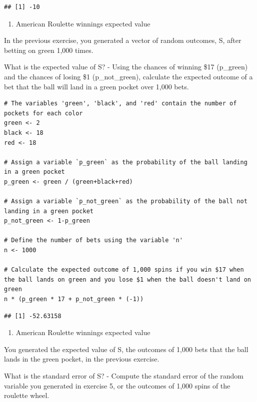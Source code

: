 \documentclass[
]{article}
\providecommand{\tightlist}{%
  \setlength{\itemsep}{0pt}\setlength{\parskip}{0pt}}
\begin{document}
\begin{verbatim}
## [1] -10
\end{verbatim}

\begin{enumerate}
\def\labelenumi{\arabic{enumi}.}
\setcounter{enumi}{5}
\tightlist
\item
  American Roulette winnings expected value
\end{enumerate}

In the previous exercise, you generated a vector of random outcomes, S,
after betting on green 1,000 times.

What is the expected value of S? - Using the chances of winning \$17
(p\_green) and the chances of losing \$1 (p\_not\_green), calculate the
expected outcome of a bet that the ball will land in a green pocket over
1,000 bets.

\begin{verbatim}
# The variables 'green', 'black', and 'red' contain the number of pockets for each color
green <- 2
black <- 18
red <- 18

# Assign a variable `p_green` as the probability of the ball landing in a green pocket
p_green <- green / (green+black+red)

# Assign a variable `p_not_green` as the probability of the ball not landing in a green pocket
p_not_green <- 1-p_green

# Define the number of bets using the variable 'n'
n <- 1000

# Calculate the expected outcome of 1,000 spins if you win $17 when the ball lands on green and you lose $1 when the ball doesn't land on green
n * (p_green * 17 + p_not_green * (-1))
\end{verbatim}

\begin{verbatim}
## [1] -52.63158
\end{verbatim}

\begin{enumerate}
\def\labelenumi{\arabic{enumi}.}
\setcounter{enumi}{6}
\tightlist
\item
  American Roulette winnings expected value
\end{enumerate}

You generated the expected value of S, the outcomes of 1,000 bets that
the ball lands in the green pocket, in the previous exercise.

What is the standard error of S? - Compute the standard error of the
random variable you generated in exercise 5, or the outcomes of 1,000
spins of the roulette wheel.
\end{document}
